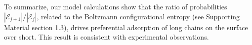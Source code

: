 \documentclass[journal=mamobx,manuscript=article]{achemso}
\begin{document}




To summarize, our model calculations show that the ratio of probabilities $|\mathcal{E}_{j+1}|/|\mathcal{E}_j|$,
related to the Boltzmann configurational entropy (see Supporting Material section 1.3), drives preferential adsorption of long chains on the surface over short.
This result is consistent with experimental observations. 
\end{document}
